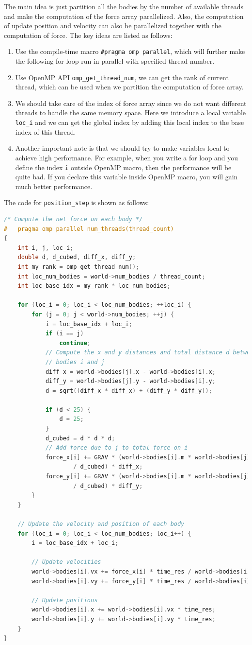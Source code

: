 \documentclass{article}
\begin{document}
The main idea is just partition all the bodies by the number of available
threads and make the computation of the force array parallelized. Also, the
computation of update position and velocity can also be parallelized
together with the computation of force. The key ideas are listed as follows:
\begin{enumerate}
	\item Use the compile-time macro \verb|#pragma omp parallel|, which will further make the following for loop run in parallel with specified thread number.
	\item Use OpenMP API \verb|omp_get_thread_num|, we can get the rank of current thread, which can be used when we partition the computation of force array.
	\item We should take care of the index of force array since we do not want different threads to handle the same memory space. Here we introduce a local variable \verb|loc_i| and we can get the global index by adding this local index to the base index of this thread.
	\item Another important note is that we should try to make variables 
		local to achieve high performance. For example, when you write
		a for loop and you define the index \verb|i| outside OpenMP macro,
		then the performance will be quite bad. If you declare this variable
		inside OpenMP macro, you will gain much better performance.
\end{enumerate}

The code for \verb|position_step| is shown as follows:
\begin{lstlisting}[language=C]
  /* Compute the net force on each body */
#	pragma omp parallel num_threads(thread_count)
{
	int i, j, loc_i;
	double d, d_cubed, diff_x, diff_y;
	int my_rank = omp_get_thread_num();
	int loc_num_bodies = world->num_bodies / thread_count;
	int loc_base_idx = my_rank * loc_num_bodies;

	for (loc_i = 0; loc_i < loc_num_bodies; ++loc_i) {
		for (j = 0; j < world->num_bodies; ++j) {
			i = loc_base_idx + loc_i;
			if (i == j)
				continue;
			// Compute the x and y distances and total distance d between
			// bodies i and j
			diff_x = world->bodies[j].x - world->bodies[i].x;
			diff_y = world->bodies[j].y - world->bodies[i].y;
			d = sqrt((diff_x * diff_x) + (diff_y * diff_y));

			if (d < 25) {
				d = 25;
			}
			d_cubed = d * d * d;
			// Add force due to j to total force on i
			force_x[i] += GRAV * (world->bodies[i].m * world->bodies[j].m
					/ d_cubed) * diff_x;
			force_y[i] += GRAV * (world->bodies[i].m * world->bodies[j].m
					/ d_cubed) * diff_y;
		}
	}
	
	// Update the velocity and position of each body
	for (loc_i = 0; loc_i < loc_num_bodies; loc_i++) {
		i = loc_base_idx + loc_i;

		// Update velocities
		world->bodies[i].vx += force_x[i] * time_res / world->bodies[i].m;
		world->bodies[i].vy += force_y[i] * time_res / world->bodies[i].m;		
		
		// Update positions
		world->bodies[i].x += world->bodies[i].vx * time_res;
		world->bodies[i].y += world->bodies[i].vy * time_res;
	}	
}
\end{lstlisting}
\end{document}
